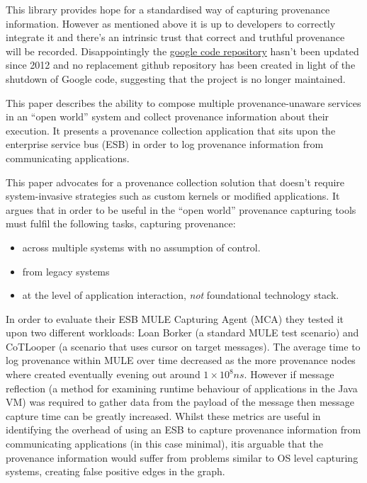 This library provides hope for a standardised way of capturing provenance information. However as mentioned above it is up to developers to correctly integrate it and there's an intrinsic trust that correct and truthful provenance will be recorded. Disappointingly the \href{https://code.google.com/p/core-provenance-library/}{google code repository} hasn't been updated since 2012 and no replacement github repository has been created in light of the shutdown of Google code, suggesting that the project is no longer maintained.

This paper describes the ability to compose multiple provenance-unaware services in an ``open world'' system and collect provenance information about their execution. It presents a provenance collection application that sits upon the enterprise service bus (ESB) in order to log provenance information from communicating applications.

This paper advocates for a provenance collection solution that doesn't require system-invasive strategies such as custom kernels or modified applications. It argues that in order to be useful in the ``open world'' provenance capturing tools must fulfil the following tasks, capturing provenance:
\begin{itemize}
  \item across multiple systems with no assumption of control.
  \item from legacy systems
  \item at the level of application interaction, \textit{not} foundational technology stack.
\end{itemize}

In order to evaluate their ESB MULE Capturing Agent (MCA) they tested it upon two different workloads: Loan Borker (a standard MULE test scenario) and CoTLooper (a scenario that uses cursor on target messages). The average time to log provenance within MULE over time decreased as the more provenance nodes where created eventually evening out around $1 \times 10^8ns$. However if message reflection (a method for examining runtime behaviour of applications in the Java VM) was required to gather data from the payload of the message then message capture time can be greatly increased. Whilst these metrics are useful in identifying the overhead of using an ESB to capture provenance information from communicating applications (in this case minimal), itis arguable that the provenance information would suffer from problems similar to OS level capturing systems, creating false positive edges in the graph.

